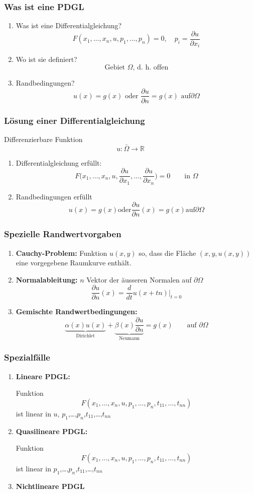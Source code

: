 \begin{frame}
\frametitle{Was ist eine PDGL}
\begin{enumerate}
\item Was ist eine Differentialgleichung?
\[
F( x_1,\dots,x_n,u,p_1, \dots,p_n) =0,\quad p_i=\frac{\partial u}{\partial x_i}
\]
\item Wo ist sie definiert?
\[
\text{Gebiet $\Omega$, d.~h.~offen}
\]
\item Randbedingungen?
\[
\text{$u(x)=g(x)$ oder $\frac{\partial u}{\partial n}=g(x)$ auf
$\partial\Omega$}
\]
\end{enumerate}
\end{frame}

\begin{frame}
\frametitle{Lösung einer Differentialgleichung}
Differenzierbare Funktion
\[
u\colon \bar\Omega\to\mathbb R
\]
\pause
\begin{enumerate}
\item Differentialgleichung erfüllt:
\[
F\biggl(x_1,\dots,x_n,u,
\frac{\partial u}{\partial x_1},\dots, \frac{\partial u}{\partial x_n}
\biggr)=0\qquad\text{in $\Omega$}
\]
\pause
\item Randbedingungen erfüllt
\[
\text{
$u(x)=g(x)$
oder
$\frac{\partial u}{\partial n}(x)=g(x)$
auf
$\partial\Omega$
}
\]
\end{enumerate}
\end{frame}

\begin{frame}
\frametitle{Spezielle Randwertvorgaben}
\begin{enumerate}
\item {\bf Cauchy-Problem:}
\pause
Funktion $u(x,y)$ so, dass die Fläche $(x,y,u(x,y))$ eine vorgegebene
Raumkurve enthält.
\medskip

\pause
\item {\bf Normalableitung:}
\pause
$n$ Vektor der äusseren Normalen auf $\partial\Omega$
\[
\frac{\partial u}{\partial n}(x)
=
\frac{d}{dt}u(x+tn)\bigg|_{t=0}
\]
\pause
\item {\bf Gemischte Randwertbedingungen:}
\pause
\[
\underbrace{
\alpha(x) u(x)
}_{\text{Dirichlet}}
+
\underbrace{
\beta(x)\frac{\partial u}{\partial n}
}_{\text{Neumann}}
= g(x) 
\qquad
\text{auf $\partial\Omega$}
\]
\end{enumerate}
\end{frame}

\begin{frame}
\frametitle{Spezialfälle}
\begin{enumerate}
\item {\bf Lineare PDGL:}

\pause
Funktion
\[
F(x_1,\dots,x_n,u,p_1,\dots,p_n,t_{11},\dots,t_{nn})
\]
ist linear in {\color{red}$u$}, $p_1$,\dots,$p_n$,$t_{11}$,\dots,$t_{nn}$
\pause
\item {\bf Quasilineare PDGL:}

\pause
Funktion
\[
F(x_1,\dots,x_n,u,p_1,\dots,p_n,t_{11},\dots,t_{nn})
\]
ist linear in $p_1$,\dots,$p_n$,$t_{11}$,\dots,$t_{nn}$
\pause
\item {\bf Nichtlineare PDGL}
\end{enumerate}
\end{frame}

